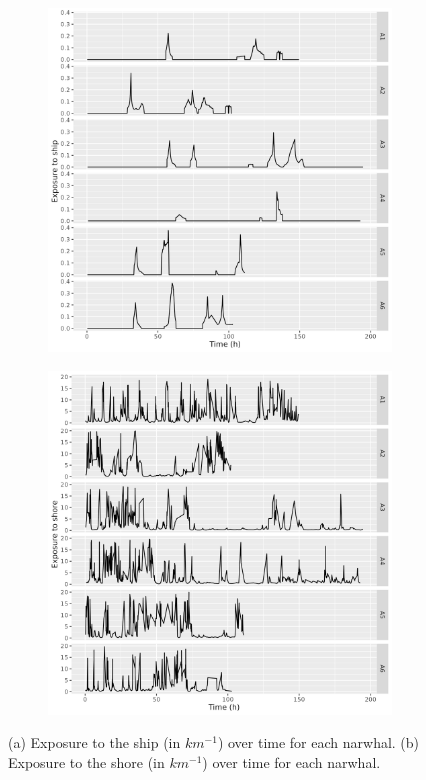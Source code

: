\documentclass[11pt]{article}
\newcommand {\1}{\mathbb{1}}
\begin{document}
\begin{figure}[H]
	\centering
	\begin{subfigure}{0.48\textwidth}
		\centering
		\includegraphics[scale=0.42]{images/data_exploration/realExpShip_through_time.png}
		\caption{}
	\end{subfigure}
	\begin{subfigure}{0.48\textwidth}
		\centering
		\includegraphics[scale=0.42]{images/data_exploration/realExpShore_through_time.png}
		\caption{}
	\end{subfigure}
	\caption{(a) Exposure to the ship (in $km^{-1}$) over time for each narwhal. (b) Exposure to the shore (in $km^{-1}$) over time for each narwhal.}  
	\label{fig: realexpthroughtime}
\end{figure}
\end{document}
